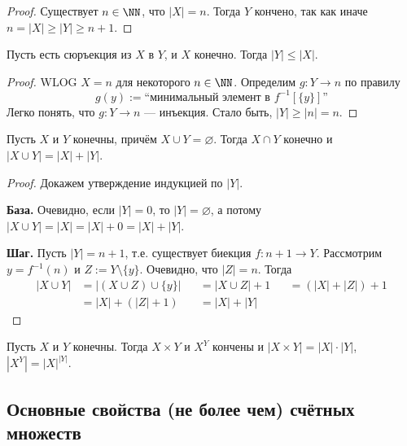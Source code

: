 \documentclass[12pt,a4paper]{article}
\begin{document}
    \begin{proof}
        Существует $n \in \NN$, что $|X| = n$. Тогда $Y$ кончено, так как иначе $n = |X| \geqslant |Y| \geqslant n+1$.
    \end{proof}

    \begin{statement}
        Пусть есть сюръекция из $X$ в $Y$, и $X$ конечно. Тогда $|Y| \leqslant |X|$.
    \end{statement}

    \begin{proof}
        WLOG $X=n$ для некоторого $n \in \NN$. Определим $g: Y \to n$ по правилу
        \[
            g(y) := \text{``минимальный элемент в $f^{-1}[\{y\}]$''}
        \]
        Легко понять, что $g: Y \to n$ --- инъекция. Стало быть, $|Y| \geqslant |n| = n$.
    \end{proof}

    \begin{statement}
        Пусть $X$ и $Y$ конечны, причём $X \cup Y = \varnothing$. Тогда $X \cap Y$ конечно и $|X \cup Y| = |X| + |Y|$.
    \end{statement}

    \begin{proof}
        Докажем утверждение индукцией по $|Y|$.

        \textbf{База.} Очевидно, если $|Y| = 0$, то $|Y| = \varnothing$, а потому $|X \cup Y| = |X| = |X| + 0 = |X| + |Y|$.

        \textbf{Шаг.} Пусть $|Y| = n+1$, т.е. существует биекция $f: n+1 \to Y$. Рассмотрим $y = f^{-1}(n)$ и $Z := Y \setminus \{y\}$. Очевидно, что $|Z| = n$. Тогда
        \begin{align*}
            |X \cup Y|
            &= |(X \cup Z) \cup \{y\}|&
            &= |X \cup Z| + 1&
            &= (|X| + |Z|) + 1\\
            &= |X| + (|Z| + 1)&
            &= |X| + |Y|
        \end{align*}
    \end{proof}

    \begin{statement}
        Пусть $X$ и $Y$ конечны. Тогда $X \times Y$ и $X^Y$ кончены и $|X\times Y| = |X|\cdot |Y|$, $|X^Y|=|X|^{|Y|}$.
    \end{statement}

    \subsection{Основные свойства (не более чем) счётных множеств}
\end{document}

